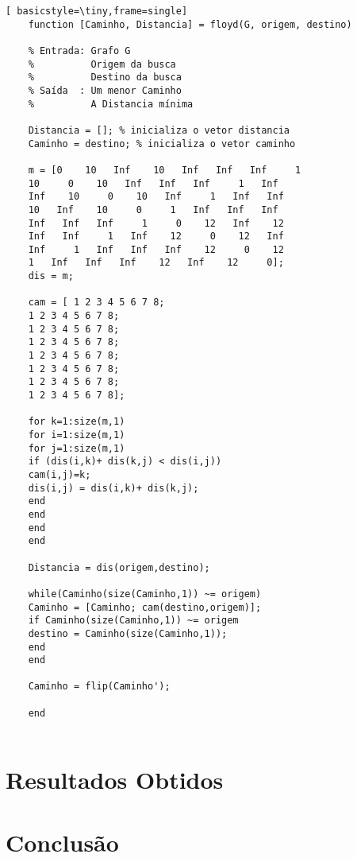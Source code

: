 \documentclass[
12pt,				%
openright,			%
oneside,			%
a4paper,			%
english,			%
french,				%
spanish,			%
brazil,				%
]{abntex2}
\begin{document}
	\begin{lstlisting}[ basicstyle=\tiny,frame=single]
	function [Caminho, Distancia] = floyd(G, origem, destino)
	
	% Entrada: Grafo G
	%          Origem da busca
	%          Destino da busca
	% Saída  : Um menor Caminho
	%          A Distancia mínima
	
	Distancia = []; % inicializa o vetor distancia
	Caminho = destino; % inicializa o vetor caminho
	
	m = [0    10   Inf    10   Inf   Inf   Inf     1
	10     0    10   Inf   Inf   Inf     1   Inf
	Inf    10     0    10   Inf     1   Inf   Inf
	10   Inf    10     0     1   Inf   Inf   Inf
	Inf   Inf   Inf     1     0    12   Inf    12
	Inf   Inf     1   Inf    12     0    12   Inf
	Inf     1   Inf   Inf   Inf    12     0    12
	1   Inf   Inf   Inf    12   Inf    12     0];
	dis = m;
	
	cam = [ 1 2 3 4 5 6 7 8;
	1 2 3 4 5 6 7 8;
	1 2 3 4 5 6 7 8;
	1 2 3 4 5 6 7 8;
	1 2 3 4 5 6 7 8;
	1 2 3 4 5 6 7 8;
	1 2 3 4 5 6 7 8;
	1 2 3 4 5 6 7 8];
	
	for k=1:size(m,1)
	for i=1:size(m,1)
	for j=1:size(m,1)
	if (dis(i,k)+ dis(k,j) < dis(i,j))
	cam(i,j)=k;
	dis(i,j) = dis(i,k)+ dis(k,j);
	end
	end
	end
	end
	
	Distancia = dis(origem,destino);
	
	while(Caminho(size(Caminho,1)) ~= origem)
	Caminho = [Caminho; cam(destino,origem)];
	if Caminho(size(Caminho,1)) ~= origem
	destino = Caminho(size(Caminho,1));
	end
	end
	
	Caminho = flip(Caminho');
	
	end
	
	\end{lstlisting}
	
	\chapter{Resultados Obtidos}
	\chapter{Conclusão}
	
	
	
\end{document}
